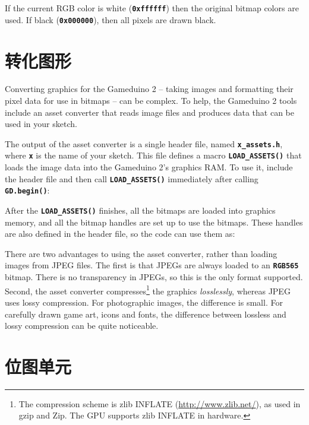 \documentclass[10pt]{book}
\newcommand{\mach}[1]{\texttt{\textbf{#1}}}
\begin{document}
\begin{CJK}{UTF8}{gkai}

If the current RGB color is white (\mach{0xffffff}) then 
the original bitmap colors are used.
If black (\mach{0x000000}), then all pixels are drawn black.
\clearpage

\newpage
\section{转化图形}
\label{assets}

Converting graphics for the Gameduino 2 -- taking images and formatting their pixel data for
use in bitmaps -- can be complex.
To help, the Gameduino 2 tools include an asset converter that reads image files and produces data that can be used in your sketch.

The output of the asset converter is a single header file, named \mach{x\_assets.h}, where
\mach{x} is the name of your sketch.
This file defines
a macro \mach{LOAD\_ASSETS()} that loads the image data into the
Gameduino 2's graphics RAM.
To use it, include the header file and then call \mach{LOAD\_ASSETS()} immediately after calling \mach{GD.begin()}:


After the \mach{LOAD\_ASSETS()} finishes, all the bitmaps are loaded into graphics memory,
and all the bitmap handles are set up to use the bitmaps.
These handles are also defined in the header file, so the code can use them as:


There are two advantages to using the asset converter, rather than loading images from JPEG files.
The first is that JPEGs are always loaded to an \mach{RGB565} bitmap.
There is no transparency in JPEGs, so this is the only format supported.
Second, the asset converter compresses\footnote{
The compression scheme is zlib INFLATE
(\url{http://www.zlib.net/}), as used in gzip and Zip.
The GPU supports zlib INFLATE in hardware.
} the graphics \textit{losslessly},
whereas JPEG uses lossy compression.
For photographic images, the difference is small.
For carefully drawn game art, icons and fonts, the difference between lossless and lossy compression can be quite noticeable.

\newpage
\section{位图单元}


\end{CJK}
\end{document}
